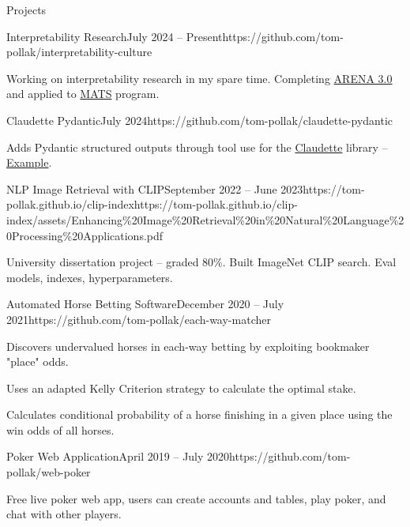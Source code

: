 \documentclass{structure}
\begin{document}
\begin{rSection}{Projects}

    \begin{rSubsection}{Interpretability Research}{July 2024 -- Present}{}{}{https://github.com/tom-pollak/interpretability-culture}{}
        \item Working on interpretability research in my spare time. Completing \href{https://arena3-chapter1-transformer-interp.streamlit.app/}{ARENA 3.0} and applied to \href{https://www.matsprogram.org/}{MATS} program.
    \end{rSubsection}

    \begin{rSubsection}{Claudette Pydantic}{July 2024}{}{}{https://github.com/tom-pollak/claudette-pydantic}{}
        \item Adds Pydantic structured outputs through tool use for the \href{https://github.com/AnswerDotAI/claudette}{Claudette} library -- {\color{blue}\href{https://nbviewer.org/github/tom-pollak/claudette-pydantic/blob/main/nbs/examples/pet_store.ipynb}{Example}}.
    \end{rSubsection}

    \begin{rSubsection}{NLP Image Retrieval with CLIP}{September 2022 -- June 2023}{}{}{https://tom-pollak.github.io/clip-index}{https://tom-pollak.github.io/clip-index/assets/Enhancing\%20Image\%20Retrieval\%20in\%20Natural\%20Language\%20Processing\%20Applications.pdf}
        \item University dissertation project -- graded 80\%. Built ImageNet CLIP search. Eval models, indexes, hyperparameters.
    \end{rSubsection}

    \begin{rSubsection}{Automated Horse Betting Software}{December 2020 -- July 2021}{}{}{https://github.com/tom-pollak/each-way-matcher}{}
        \item Discovers undervalued horses in each-way betting by exploiting bookmaker "place" odds.
        \item Uses an adapted Kelly Criterion strategy to calculate the optimal stake.
        \item Calculates conditional probability of a horse finishing in a given place using the win odds of all horses.
    \end{rSubsection}

    \begin{rSubsection}{Poker Web Application}{April 2019 -- July 2020}{}{}{https://github.com/tom-pollak/web-poker}{}
        \item Free live poker web app, users can create accounts and tables, play poker, and chat with other players.
    \end{rSubsection}


\end{rSection}
\end{document}
